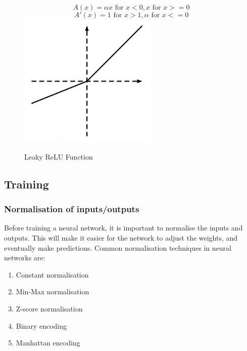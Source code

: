 \begin{figure}[H]
\caption{Leaky ReLU Function}
\label{fig:Leaky ReLU}
\centering
\begin{equation}
A(x)=\alpha x \text{ for } x<0, x \text{ for } x >=0
\end{equation}
\begin{equation}
A'(x)=1 \text{ for } x>1, \alpha \text{ for } x<=0
\end{equation}
\includegraphics[width=0.6\textwidth]{Figures/LeakyReLU.png}
\end{figure}

\subsection{Training}

\subsubsection{Normalisation of inputs/outputs}\label{normalisation}

Before training a neural network, it is important to normalise the inputs and outputs. This will make it easier for the network to adjust the weights, and eventually make predictions\cite{Caudill_nn_primer}. Common normalisation techniques in neural networks are:

\begin{enumerate}
    \item Constant normalisation
    \item Min-Max normalisation
    \item Z-score normalisation
    \item Binary encoding
    \item Manhattan encoding
\end{enumerate}

